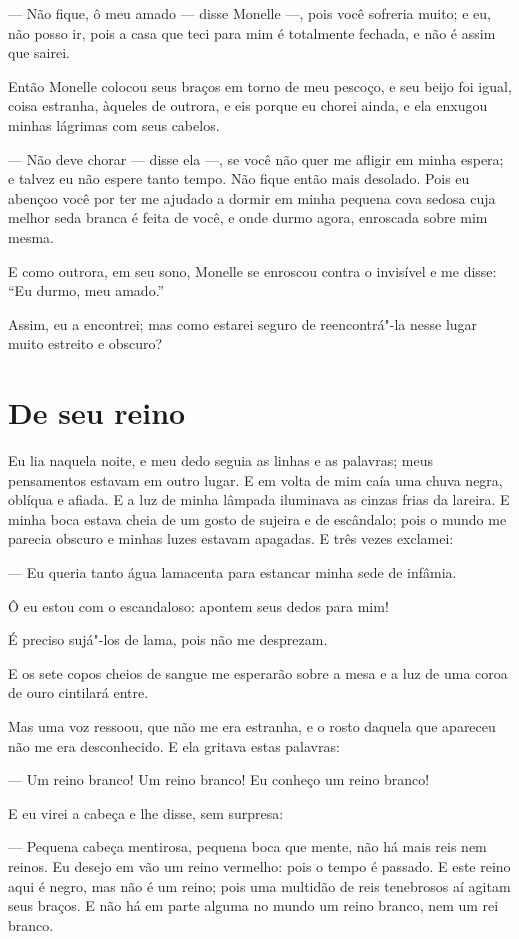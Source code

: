 --- Não fique, ô meu amado --- disse Monelle ---, pois você sofreria muito; e
eu, não posso ir, pois a casa que teci para mim é totalmente fechada, e
não é assim que sairei.

Então Monelle colocou seus braços em torno de meu pescoço, e seu beijo
foi igual, coisa estranha, àqueles de outrora, e eis porque eu chorei
ainda, e ela enxugou minhas lágrimas com seus cabelos.

--- Não deve chorar --- disse ela ---, se você não quer me afligir em minha
espera; e talvez eu não espere tanto tempo. Não fique então mais desolado.
Pois eu abençoo você por ter me ajudado a dormir em minha pequena cova
sedosa cuja melhor seda branca é feita de você, e onde durmo agora,
enroscada sobre mim mesma.

E como outrora, em seu sono, Monelle se enroscou contra o invisível e
me disse: “Eu durmo, meu amado.”

Assim, eu a encontrei; mas como estarei seguro de reencontrá"-la nesse
lugar muito estreito e obscuro?

\section*{De seu reino}

Eu lia naquela noite, e meu dedo seguia as linhas e as palavras; meus
pensamentos estavam em outro lugar. E em volta de mim caía uma chuva
negra, oblíqua e afiada. E a luz de minha lâmpada iluminava as cinzas
frias da lareira. E minha boca estava cheia de um gosto de sujeira e de
escândalo; pois o mundo me parecia obscuro e minhas luzes estavam
apagadas. E três vezes exclamei:

--- Eu queria tanto água lamacenta para estancar minha sede de infâmia.

Ô eu estou com o escandaloso: apontem seus dedos para mim!

É preciso sujá"-los de lama, pois não me desprezam.

E os sete copos cheios de sangue me esperarão sobre a mesa e a luz de
uma coroa de ouro cintilará entre.

Mas uma voz ressoou, que não me era estranha, e o rosto daquela que
apareceu não me era desconhecido. E ela gritava estas palavras:

--- Um reino branco! Um reino branco! Eu conheço um reino branco!

E eu virei a cabeça e lhe disse, sem surpresa:

--- Pequena cabeça mentirosa, pequena boca que mente, não há mais reis
nem reinos. Eu desejo em vão um reino vermelho: pois o tempo é passado. E
este reino aqui é negro, mas não é um reino; pois uma multidão de reis
tenebrosos aí agitam seus braços. E não há em parte alguma no mundo um
reino branco, nem um rei branco.

